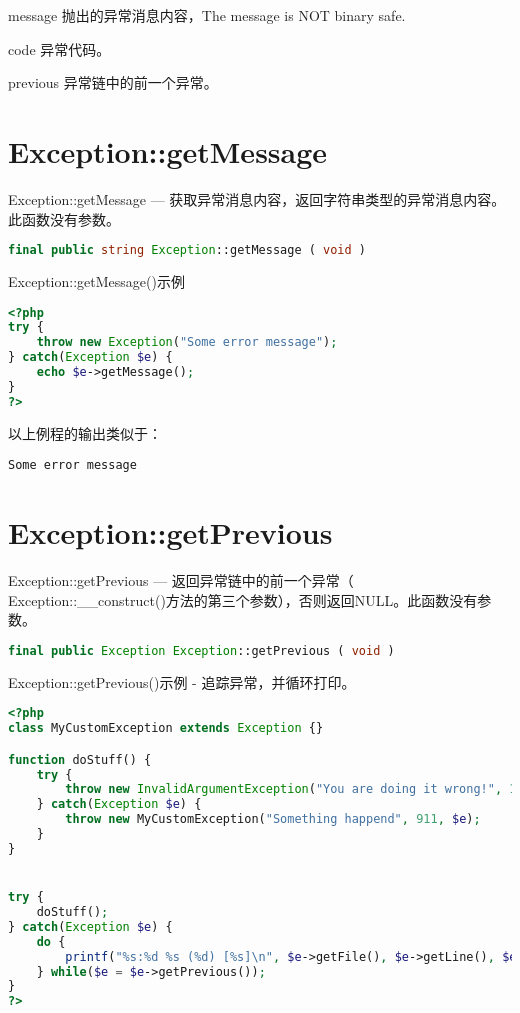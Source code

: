 \begin{compactitem}
\item message
抛出的异常消息内容，The message is NOT binary safe.
\item code
异常代码。
\item previous
异常链中的前一个异常。
\end{compactitem}


\section{Exception::getMessage}

Exception::getMessage — 获取异常消息内容，返回字符串类型的异常消息内容。此函数没有参数。

\begin{lstlisting}[language=PHP]
final public string Exception::getMessage ( void )
\end{lstlisting}




\begin{example}
Exception::getMessage()示例
\begin{lstlisting}[language=PHP]
<?php
try {
    throw new Exception("Some error message");
} catch(Exception $e) {
    echo $e->getMessage();
}
?>
\end{lstlisting}
\end{example}

以上例程的输出类似于：

\begin{verbatim}
Some error message
\end{verbatim}

\section{Exception::getPrevious}

Exception::getPrevious — 返回异常链中的前一个异常（ Exception::\_\_construct()方法的第三个参数），否则返回NULL。此函数没有参数。

\begin{lstlisting}[language=PHP]
final public Exception Exception::getPrevious ( void )
\end{lstlisting}



\begin{example}
Exception::getPrevious()示例 - 追踪异常，并循环打印。
\begin{lstlisting}[language=PHP]
<?php
class MyCustomException extends Exception {}

function doStuff() {
    try {
        throw new InvalidArgumentException("You are doing it wrong!", 112);
    } catch(Exception $e) {
        throw new MyCustomException("Something happend", 911, $e);
    }
}


try {
    doStuff();
} catch(Exception $e) {
    do {
        printf("%s:%d %s (%d) [%s]\n", $e->getFile(), $e->getLine(), $e->getMessage(), $e->getCode(), get_class($e));
    } while($e = $e->getPrevious());
}
?>
\end{lstlisting}
\end{example}


